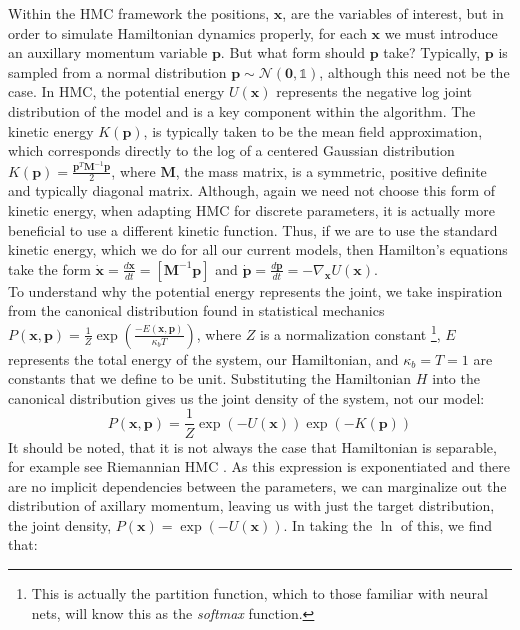 \documentclass[twoside]{article}
\begin{document}
Within the HMC framework the positions, $\textbf{x}$, are the variables of interest, but in order to simulate Hamiltonian dynamics properly, for each $\textbf{x}$ we must introduce an auxillary momentum variable $\textbf{p}$. But what form should $\textbf{p}$ take? Typically, $\textbf{p}$ is sampled from a normal distribution $\textbf{p} \sim \mathcal{N}(\textbf{0}, \mathds{1})$, although this need not be the case. In HMC, the potential energy $U(\textbf{x})$ represents the negative log joint distribution of the model and is a key component within the algorithm.  The kinetic energy $K(\textbf{p})$, is typically taken to be the mean field approximation, which corresponds directly to the log of a centered Gaussian distribution $K(\textbf{p}) = \frac{\textbf{p}^{T} \textbf{M}^{-1} \textbf{p}}{2}$, where $\textbf{M}$, the mass matrix, is a symmetric, positive definite and typically diagonal matrix. Although, again we need not choose this form of kinetic energy, when adapting HMC for discrete parameters, it is actually more beneficial to use a different kinetic function\citep{nishimura2017discontinuous}. Thus, if we are to use the standard kinetic energy, which we do for all our current models, then Hamilton's equations take the form $
\dot{\textbf{x}} = \frac{d\textbf{x}}{dt} = [\textbf{M}^{-1}\textbf{p}]$ and $ \dot{\textbf{p}} = \frac{d\textbf{p}}{dt} = -\nabla_{\textbf{x}}U(\textbf{x})$.\\
To understand why the potential energy represents the joint, we take inspiration from the canonical distribution found in statistical mechanics
$P(\textbf{x},\textbf{p}) = \frac{1}{Z}\exp\left(\frac{-E(\textbf{x},\textbf{p})}{\kappa_{b}T}\right)$,
where $Z$ is a normalization constant \footnote{This is actually the partition function, which to those familiar with neural nets, will know this as the \textit{softmax} function. }, $E$ represents the total energy of the system, our Hamiltonian, and $\kappa_{b} = T = 1$ are constants that we define to be unit. Substituting the Hamiltonian $H$ into the canonical distribution gives us the joint density of the system, not our model:
\begin{equation}
P(\textbf{x},\textbf{p}) = \frac{1}{Z}\exp(-U(\textbf{x}))\exp(-K(\textbf{p})) 
\end{equation}
It should be noted, that it is not always the case that Hamiltonian is separable, for example see Riemannian HMC \citep{girolami2011riemann}. As this expression is exponentiated and there are no implicit dependencies between the parameters, we can marginalize out the distribution of axillary momentum, leaving us with just the target distribution, the joint density, $P(\textbf{x})  = \exp(-U(\textbf{x}))$. In taking the $\ln$ of this, we find that:
\end{document}
